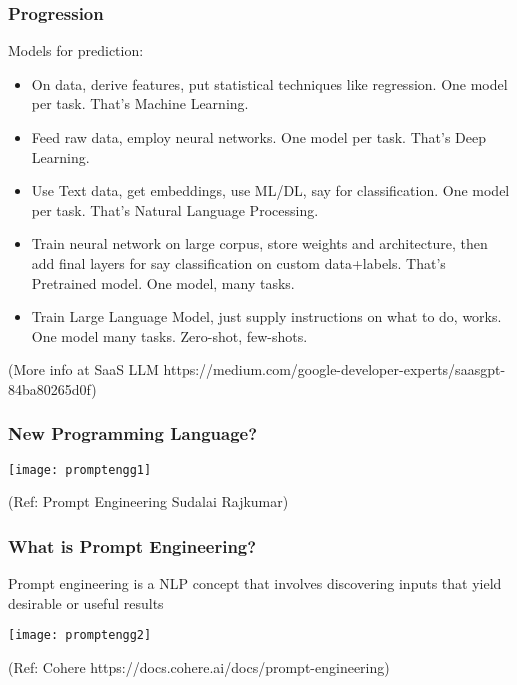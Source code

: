 \begin{frame}[fragile]\frametitle{Progression}

Models for prediction:

\begin{itemize}
\item On data, derive features, put statistical techniques like regression. One model per task. That's Machine Learning.
\item Feed raw data, employ neural networks. One model per task. That's Deep Learning.
\item Use Text data, get embeddings, use ML/DL, say for classification. One model per task. That's Natural Language Processing.
\item Train neural network on large corpus, store weights and architecture, then add final layers for say classification on custom data+labels. That's Pretrained model. One model, many tasks.
\item Train Large Language Model, just supply instructions on what to do, works. One model many tasks. Zero-shot, few-shots.
\end{itemize}

{\tiny (More info at SaaS LLM https://medium.com/google-developer-experts/saasgpt-84ba80265d0f)}

\end{frame}


\begin{frame}[fragile]\frametitle{New Programming Language?}

\begin{center}
\texttt{[image: promptengg1]}

{\tiny (Ref: Prompt Engineering Sudalai Rajkumar)}

\end{center}				

\end{frame}



\begin{frame}[fragile]\frametitle{What is Prompt Engineering?}

Prompt engineering is a NLP concept that involves discovering inputs that yield desirable or useful results


\begin{center}
\texttt{[image: promptengg2]}

{\tiny (Ref: Cohere https://docs.cohere.ai/docs/prompt-engineering)}

\end{center}				
			
			

\end{frame}



